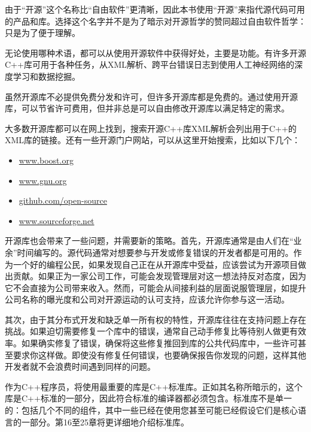 由于“开源”这个名称比“自由软件”更清晰，因此本书使用“开源”来指代源代码可用的产品和库。选择这个名字并不是为了暗示对开源哲学的赞同超过自由软件哲学：只是为了便于理解。


无论使用哪种术语，都可以从使用开源软件中获得好处，主要是功能。有许多开源C++库可用于各种任务，从XML解析、跨平台错误日志到使用人工神经网络的深度学习和数据挖掘。

虽然开源库不必提供免费分发和许可，但许多开源库都是免费的。通过使用开源库，可以节省许可费用，但并非总是可以自由修改开源库以满足特定的需求。

大多数开源库都可以在网上找到，搜索开源C++库XML解析会列出用于C++的XML库的链接。还有一些开源门户网站，可以从这里开始搜索，比如以下几个：

\begin{itemize}
\item
\url{www.boost.org}

\item
\url{www.gnu.org}

\item
\url{github.com/open-source}

\item
\url{www.sourceforge.net}
\end{itemize}


开源库也会带来了一些问题，并需要新的策略。首先，开源库通常是由人们在“业余”时间编写的。源代码通常对想要参与开发或修复错误的开发者都是可用的。作为一个好的编程公民，如果发现自己正在从开源库中受益，应该尝试为开源项目做出贡献。如果正为一家公司工作，可能会发现管理层对这一想法持反对态度，因为它不会直接为公司带来收入。然而，可能会从间接利益的层面说服管理层，如提升公司名称的曝光度和公司对开源运动的认可支持，应该允许你参与这一活动。

其次，由于其分布式开发和缺乏单一所有权的特性，开源库往往在支持问题上存在挑战。如果迫切需要修复一个库中的错误，通常自己动手修复比等待别人做更有效率。如果确实修复了错误，确保将这些修复推回到库的公共代码库中，一些许可甚至要求你这样做。即使没有修复任何错误，也要确保报告你发现的问题，这样其他开发者就不会浪费时间遇到同样的问题。


作为C++程序员，将使用最重要的库是C++标准库。正如其名称所暗示的，这个库是C++标准的一部分，因此符合标准的编译器都必须包含。标准库不是单一的：包括几个不同的组件，其中一些已经在使用您甚至可能已经假设它们是核心语言的一部分。第16至25章将更详细地介绍标准库。

